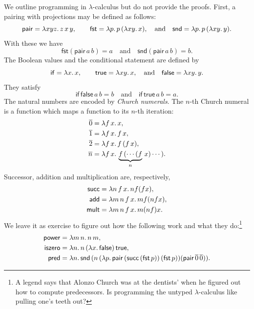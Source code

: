 We outline programming in $\lambda$-calculus but do not provide the
proofs. First, a pairing with projections may be defined as follows:
%
\begin{equation*}
  \mathsf{pair} = \lambda x y z .\,z\, x\, y,
  \qquad
  \mathsf{fst} = \lambda p .\,p \, (\lambda x y .\,x),
  \quad\text{and}\quad
  \mathsf{snd} = \lambda p .\,p \, (\lambda x y .\,y).
\end{equation*}
%
With these we have
%
\begin{equation*}
  \mathsf{fst} (\mathsf{pair}\, a\, b) = a
  \quad\text{and}\quad
  \mathsf{snd} (\mathsf{pair}\, a\, b) = b.
\end{equation*}
%
The Boolean values and the conditional statement are defined by
%
\begin{equation*}
  \mathsf{if} = \lambda x .\,x,
  \qquad
  \mathsf{true} = \lambda x y .\,x,
  \quad\text{and}\quad
  \mathsf{false} = \lambda x y .\,y.
\end{equation*}
%
They satisfy
%
\begin{equation*}
  \mathsf{if}\,\mathsf{false}\,a\,b = b
  \quad\text{and}\quad
  \mathsf{if}\,\mathsf{true}\,a\,b = a.
\end{equation*}
%
The natural numbers are encoded by \emph{Church numerals}. The $n$-th
Church numeral is a function which maps a function to its $n$-th
iteration:
%
\begin{align*}
  \overline{0} &= \lambda f\,x .\,x,\\
  \overline{1} &= \lambda f\,x .\,f\,x,\\
  \overline{2} &= \lambda f\,x .\,f\,(f\,x),\\
  \overline{n} &= \lambda f\,x .\,\underbrace{f\,(\cdots (f}_n\,x) \cdots).
\end{align*}
%
Successor, addition and multiplication are, respectively,
%
\begin{align*}
  \mathsf{succ} &= \lambda n\,f\,x .\,n f (f x),\\
  \mathsf{add} &= \lambda m\,n\,f\,x .\,m f (n f x),\\
  \mathsf{mult} &= \lambda m\,n\,f\,x .\,m (n f) x.
\end{align*}
%
We leave it as exercise to figure out how the following work and what
they do:\footnote{A legend says that Alonzo Church was at the
  dentists' when he figured out how to compute predecessors. Is
  programming the untyped $\lambda$-calculus like pulling one's teeth
  out?}
%
\begin{align*}
  \mathsf{power} &= \lambda m\,n .\,n\,m,\\
  \mathsf{iszero} &= \lambda n .\,n\, (\lambda x .\,\mathsf{false})\, \mathsf{true},\\
  \mathsf{pred} &=
    \lambda n .\,
      \mathsf{snd}\, (n\, (\lambda p .\,
        \mathsf{pair}\, (\mathsf{succ}\, (\mathsf{fst}\, p))\,
        (\mathsf{fst}\, p))
      (\mathsf{pair}\, \overline{0}\, \overline{0})).
\end{align*}
